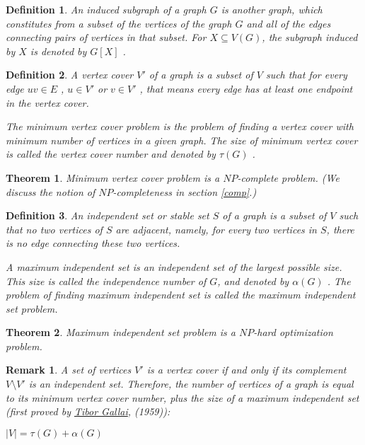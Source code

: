 \documentclass[12pt]{article}
\theoremstyle{slplain}
\newtheorem{theorem}{Theorem}
\newtheorem{defi}{Definition}
\newtheorem{rema}{Remark}
\begin{document}
\begin{defi}
An induced subgraph of a graph $G$ is another graph, which constitutes from a subset of the vertices of the graph $G$ and all of the edges connecting pairs of vertices in that subset. For $X \subseteq V(G)$, the subgraph induced by $X$ is denoted by $G[X]$ .
\end{defi}


\begin{defi}
A vertex cover $V'$ of a graph is a subset of $V$ such that for every edge $uv \in E$ , $u \in V'$ or $v \in V'$ , that means every edge has at least one endpoint in the vertex cover. 

The minimum vertex cover problem is the problem of finding a vertex  cover with minimum number of vertices in a given graph. The size of minimum vertex cover is called the vertex cover number and denoted by $\tau(G)$ .
\end{defi}

\begin{theorem}
Minimum vertex cover problem is a $NP$-complete problem.\cite{cormen} (We discuss the notion of $NP$-completeness in section \ref{comp}.) 
\end{theorem}

\begin{defi}
An independent set or stable set $S$ of a graph is a subset
of $V$ such that no two vertices of $S$ are adjacent, namely, for every two
vertices in $S$, there is no edge connecting these two vertices. 

A maximum independent set is an independent set of the largest possible size. This size is called the independence number of $G$, and denoted by $\alpha(G)$ . The problem of finding maximum independent set is called the maximum independent set problem.
\end{defi}

\begin{theorem}	
Maximum independent set problem is a $NP$-hard optimization problem.\cite{karp}
\end{theorem}

\begin{rema}
A set of vertices $V'$ is a vertex cover if and only if its complement
$V \setminus V'$ is an independent set. Therefore, the number of vertices of a graph
is equal to its minimum vertex cover number, plus the size of a maximum
independent set (first proved by \href{https://en.wikipedia.org/wiki/Tibor_Gallai}{Tibor Gallai}, (1959)\cite{gallai}):

\vspace{0.5cm}
\begin{center}
$|V| = \tau(G) + \alpha(G)$
\end{center}
\end{rema}
\end{document}
